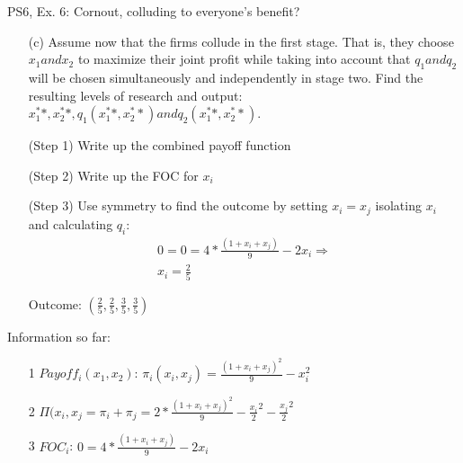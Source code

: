 \begin{frame}{PS6, Ex. 6: Cornout, colluding to everyone's benefit?}
    \begin{itemize}
    \item[(c)] Assume now that the firms collude in the first stage. That is, they choose $x_1 and x_2$ to maximize their joint profit while taking into account that $q_1 and q_2$ will be chosen simultaneously and independently in stage two. Find the resulting levels of research and output: $x_1^**,x_2^**,q_1(x_1^**,x_2^**) and q_2(x_1^**,x_2^**)$.
    \end{itemize}
    \vfill\null
  \begin{multicols}{2}
    \begin{itemize}
      \item[(Step 1)] Write up the combined payoff function
      \item[(Step 2)] Write up the FOC for $x_i$
      \item[(Step 3)] Use symmetry to find the outcome by setting $x_i=x_j$ isolating $x_i$ and calculating $q_i$:
      \begin{align*}
          0 = 0=4*\frac{(1+x_i+x_j)}{9}-2x_i \Rightarrow \\ x_i=\frac{2}{5}
      \end{align*}
      \item[Outcome:] \begin{math} \left(\frac{2}{5},\frac{2}{5},\frac{3}{5},\frac{3}{5}\right)\end{math}
    \end{itemize}
    \vfill\null \columnbreak
    Information so far:
    \begin{itemize}
    \item[1] $Payoff_i(x_1,x_2)$: $\pi_i(x_i,x_j) = \frac{(1+x_i+x_j)^2}{9}-x_i^2 $
    \item[2] $\Pi(x_i,x_j= \pi_i + \pi_j = 2*\frac{(1+x_i+x_j)^2}{9}-\frac{x_i}{2}^2-\frac{x_j}{2}^2 $
    \item[3] $FOC_i$: $0=4*\frac{(1+x_i+x_j)}{9}-2x_i$
    \end{itemize}
    \vfill\null
  \end{multicols}
\end{frame}

